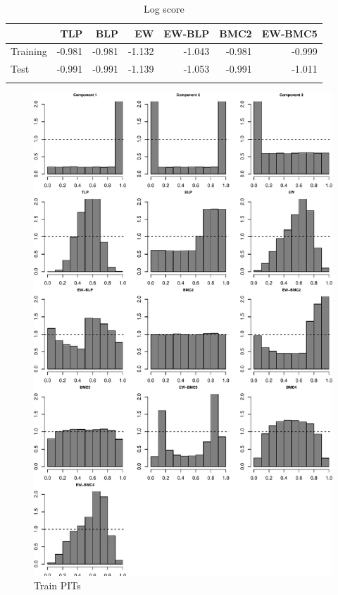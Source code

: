 \documentclass[
]{article}
\begin{document}
\begin{table}[H]
\caption{\label{tab:unnamed-chunk-11}Log score}

\centering
\fontsize{8}{10}\selectfont
\begin{tabular}[t]{lrrrrrr}
\toprule{}
  & TLP & BLP & EW & EW-BLP & BMC2 & EW-BMC5\\
\midrule{}
Training & -0.981 & -0.981 & -1.132 & -1.043 & -0.981 & -0.999\\
Test & -0.991 & -0.991 & -1.139 & -1.053 & -0.991 & -1.011\\
\bottomrule{}
\end{tabular}
\end{table}

\clearpage

\begin{figure}[h]

{\centering \includegraphics{applied_blp_sim_files/figure-latex/unnamed-chunk-12-1} 

}

\caption{Train PITs}\label{fig:unnamed-chunk-12}
\end{figure}
\end{document}

